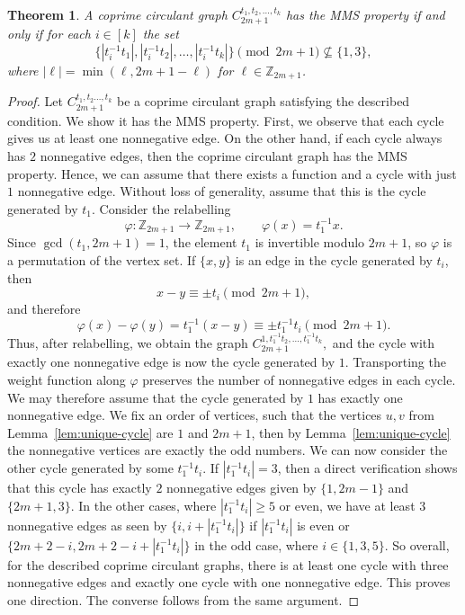 \documentclass[10pt,a4paper]{amsart}
\newtheorem{thm}{Theorem}
\begin{document}
 \begin{thm}\label{thm:circulant}
A coprime circulant graph $C_{2m+1}^{t_1,t_2,\dots,t_k}$ has the MMS property if and only if for each $i\in [k]$ the set
\[\{ |t_i^{-1}t_1|, |t_i^{-1}t_2|,\dots, |t_i^{-1}t_k|\}\pmod{2m+1}\not\subseteq\{1,3\},\]
where $|\ell|=\min(\ell,2m+1-\ell)$ for $\ell\in\mathbb{Z}_{2m+1}$.
 \end{thm}

\begin{proof}

 Let $C_{2m+1}^{t_1,t_2\dots ,t_k}$ be a coprime circulant graph satisfying the described condition. We show it has the MMS property.
 First, we observe that each cycle gives us at least one nonnegative edge.
 On the other hand, if each cycle always has $2$ nonnegative edges, then the coprime circulant graph has the MMS property.
 Hence, we can assume that there exists a function and a cycle with just $1$ nonnegative edge.
 Without loss of generality, assume that this is the cycle generated by $t_1$.
 Consider the relabelling
\[
\varphi : \mathbb{Z}_{2m+1} \to \mathbb{Z}_{2m+1}, \qquad \varphi(x)=t_1^{-1}x.
\]
Since $\gcd(t_1,2m+1)=1$, the element $t_1$ is invertible modulo $2m+1$, so
$\varphi$ is a permutation of the vertex set.
 If $\{x,y\}$ is an edge in the cycle
generated by $t_i$, then
\[
x-y \equiv \pm t_i \pmod{2m+1},
\]
and therefore
\[
\varphi(x)-\varphi(y)=t_1^{-1}(x-y)\equiv \pm t_1^{-1}t_i \pmod{2m+1}.
 \]
Thus, after relabelling, we obtain the graph
\(
C_{2m+1}^{1,t_1^{-1}t_2,\dots,t_1^{-1}t_k},
\)
and the cycle with exactly one nonnegative edge is now the cycle generated by $1$.
 Transporting the weight function along $\varphi$ preserves the number of
nonnegative edges in each cycle.
 We may therefore assume that the cycle generated by $1$ has exactly one
nonnegative edge.
 We fix an order of vertices, such that the vertices $u,v$ from Lemma~\ref{lem:unique-cycle} are $1$ and $2m+1$, then by Lemma~\ref{lem:unique-cycle} the nonnegative vertices are exactly the odd numbers.
 We can now consider the other cycle generated by some $t_1^{-1}t_i$.
 If $|t_1^{-1}t_i|=3$, then a direct verification shows that this cycle has exactly $2$ nonnegative edges given by $\{1,2m-1\}$ and $\{2m+1,3\}$.
 In the other cases, where $|t_1^{-1}t_i|\ge5$ or even, we have at least $3$ nonnegative edges as seen by $\{i,i+|t_1^{-1}t_i|\}$ if $|t_1^{-1}t_i|$ is even or $\{2m+2-i,2m+2-i+|t_1^{-1}t_i|\}$ in the odd case, where $i\in\{1,3,5\}$.
 So overall, for the described coprime circulant graphs, there is at least one cycle with three nonnegative edges and exactly one cycle with one nonnegative edge.
 This proves one direction. The converse follows from the same argument.
\end{proof}
\end{document}

